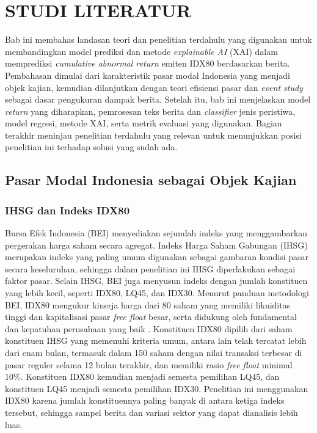 \cleardoublepage %
\chapter{STUDI LITERATUR}
\label{chap:studi-literatur}

Bab ini membahas landasan teori dan penelitian terdahulu yang digunakan untuk membandingkan model prediksi dan metode \emph{explainable AI} (XAI) dalam memprediksi \emph{cumulative abnormal return} emiten IDX80 berdasarkan berita. Pembahasan dimulai dari karakteristik pasar modal Indonesia yang menjadi objek kajian, kemudian dilanjutkan dengan teori efisiensi pasar dan \emph{event study} sebagai dasar pengukuran dampak berita. Setelah itu, bab ini menjelaskan model \emph{return} yang diharapkan, pemrosesan teks berita dan \emph{classifier} jenis peristiwa, model regresi, metode XAI, serta metrik evaluasi yang digunakan. Bagian terakhir meninjau penelitian terdahulu yang relevan untuk menunjukkan posisi penelitian ini terhadap solusi yang sudah ada.

\section{Pasar Modal Indonesia sebagai Objek Kajian}
\label{sec:pasar-modal-indonesia}

\subsection{IHSG dan Indeks IDX80}

Bursa Efek Indonesia (BEI) menyediakan sejumlah indeks yang menggambarkan pergerakan harga saham secara agregat. Indeks Harga Saham Gabungan (IHSG) merupakan indeks yang paling umum digunakan sebagai gambaran kondisi pasar secara keseluruhan, sehingga dalam penelitian ini IHSG diperlakukan sebagai faktor pasar. Selain IHSG, BEI juga menyusun indeks dengan jumlah konstituen yang lebih kecil, seperti IDX80, LQ45, dan IDX30. Menurut panduan metodologi BEI, IDX80 mengukur kinerja harga dari 80 saham yang memiliki likuiditas tinggi dan kapitalisasi pasar \emph{free float} besar, serta didukung oleh fundamental dan kepatuhan perusahaan yang baik \autocite{idx2024metodologi}. Konstituen IDX80 dipilih dari saham konstituen IHSG yang memenuhi kriteria umum, antara lain telah tercatat lebih dari enam bulan, termasuk dalam 150 saham dengan nilai transaksi terbesar di pasar reguler selama 12 bulan terakhir, dan memiliki rasio \emph{free float} minimal 10\%. Konstituen IDX80 kemudian menjadi semesta pemilihan LQ45, dan konstituen LQ45 menjadi semesta pemilihan IDX30. Penelitian ini menggunakan IDX80 karena jumlah konstituennya paling banyak di antara ketiga indeks tersebut, sehingga sampel berita dan variasi sektor yang dapat dianalisis lebih luas.

